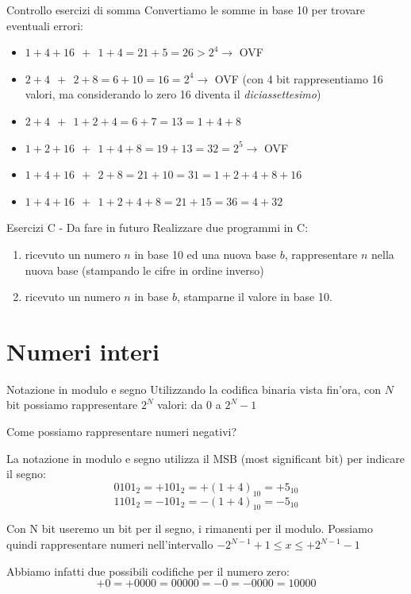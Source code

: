 \documentclass[aspectratio=169]{beamer}
\begin{document}
\begin{frame}{Controllo esercizi di somma}
Convertiamo le somme in base 10 per trovare eventuali errori:

\begin{itemize}
\item $1+4+16 \ \ + \ \ 1+4 = 21+5 = 26 > 2^4 \rightarrow$ \alert{OVF}
\item $2+4 \ \ + \ \ 2+8 = 6+10 = 16 = 2^4 \rightarrow$ \alert{OVF} (con 4 bit rappresentiamo 16 valori, ma considerando lo zero 16 diventa il \emph{diciassettesimo})
\item $2+4 \ \ + \ \ 1+2+4 = 6+7 = 13 = 1+4+8$
\item $1+2+16 \ \ + \ \ 1+4+8 = 19+13 = 32 = 2^5 \rightarrow$ \alert{OVF}
\item $1+4+16 \ \ + \ \ 2+8 = 21+10 = 31 = 1+2+4+8+16$
\item $1+4+16 \ \ + \ \ 1+2+4+8 = 21+15 = 36 = 4+32$
\end{itemize}
\end{frame}


\begin{frame}{Esercizi C - Da fare in futuro}
    Realizzare due programmi in C:
    \begin{enumerate}
        \item ricevuto un numero $n$ in base 10 ed una nuova base $b$, rappresentare $n$ nella nuova base (stampando le
            cifre in ordine inverso)
        \item ricevuto un numero $n$ in base $b$, stamparne il valore in base 10.
    \end{enumerate}
\end{frame}

\section{Numeri interi}
\begin{frame}{Notazione in modulo e segno}
Utilizzando la codifica binaria vista fin'ora, con $N$ bit possiamo rappresentare $2^N$ valori: da 0 a $2^N - 1$

Come possiamo rappresentare numeri negativi?

\pause

La notazione in modulo e segno utilizza il \alert{MSB} (most significant bit) per indicare il segno:
\[0101_2 = +101_2 = +(1+4)_{10} = +5_{10}\]
\[1101_2 = -101_2 = -(1+4)_{10} = -5_{10}\]

\pause

Con N bit useremo un bit per il segno, i rimanenti per il modulo.
Possiamo quindi rappresentare numeri nell'intervallo $-2^{N-1}+1 \leq x \leq +2^{N-1}-1$

\pause

Abbiamo infatti due possibili codifiche per il numero zero:
\[+0 = +0000 = 00000
= -0 = -0000 = 10000\]
\end{frame}
\end{document}
